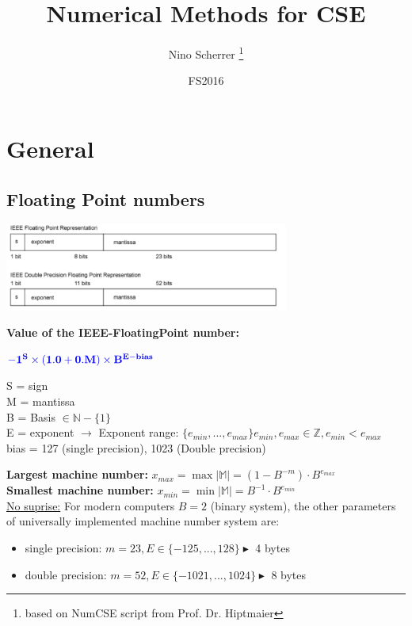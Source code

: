 \documentclass[12pt, a4paper]{article}
\title{Numerical Methods for CSE}
\author{Nino Scherrer \thanks{based on NumCSE script from Prof. Dr. Hiptmaier}}
\date{FS2016}
\newcommand{\M}{\mathbb{M}}
\begin{document}
\begin{titlepage}
\maketitle
\end{titlepage}
 
 
\section{General}

\subsection{Floating Point numbers}

\begin{center}
\includegraphics[width=0.7\textwidth]{floatingPoint_IEEE_layout.png}
\end{center}

\begin{tcolorbox}
	\textbf{Value of the IEEE-FloatingPoint number:} 
	\begin{center}
		$\color{blue}\mathbf{-1^{S} \times (1.0 + 0.M) \times B^{E-bias}}$ 
	\end{center}
	
 S = sign \\
 M = mantissa \\
 B = Basis $\in \mathbb{N}-\lbrace 1 \rbrace$ \\
 E = exponent  $\rightarrow $ Exponent range: $\lbrace e_{min}, ..., e_{max} \rbrace e_{min}, e_{max} \in \mathbb{Z}, e_{min} < e_{max}$ \\
 bias = 127 (single precision), 1023 (Double precision)
\end{tcolorbox}

\textbf{Largest machine number:} $x_{max} = \max|\M| = (1 - B^{-m}) \cdot  B^{e_{max}} $ \\
\textbf{Smallest machine number:} $x_{min} = \min|\M| = B^{-1} \cdot B^{e_{min}}$ \\

\underline{No suprise:} For modern computers $B = 2$ (binary system), the other parameters of universally implemented machine number system are:
\begin{itemize}
	\item single precision: $m=23, E \in \lbrace -125, ..., 128\rbrace \blacktriangleright$ 4 bytes 
	\item double precision: $m=52, E \in \lbrace -1021, ..., 1024 \rbrace \blacktriangleright $ 8 bytes 
\end{itemize}
\end{document}

